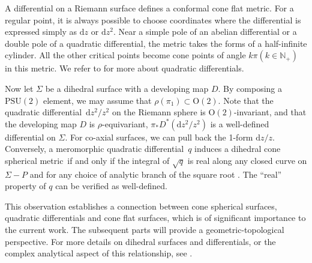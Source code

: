 \documentclass[pdflatex,sn-mathphys]{sn-jnl}%
\numberwithin{equation}{section}
\theoremstyle{thmstyleone}%
\newcommand{\NN}{\mathbb{N}}%
\newcommand{\PSUtwo}{\mathrm{PSU}(2)}
\newcommand{\Otwo}{\mathrm{O}(2)}
\newcommand{\qdf}{quadratic differential}
\newcommand{\csphsf}{cone spherical surface}
\newcommand{\csphmtr}{cone spherical metric}
\begin{document}
A differential on a Riemann surface defines a conformal cone flat metric. For a regular point, it is always possible to choose coordinates where the differential is expressed simply as $\mathrm{d}z$ or $\mathrm{d}z^2$. Near a simple pole of an abelian differential or a double pole of a \qdf, the metric takes the forms of a half-infinite cylinder. All the other critical points become cone points of angle $k\pi (k\in\NN_+)$ in this metric. We refer to \cite{Strebel, HubbardV1} for more about \qdf s.

\bigskip
Now let $\Sigma$ be a dihedral surface with a developing map $D$. 
By composing a $\PSUtwo$ element, we may assume that $\rho(\pi_1)\subset \Otwo$. Note that the \qdf\ $\mathrm{d}z^2/z^2$ on the Riemann sphere is $\Otwo$-invariant, and that the developing map $D$ is $\rho$-equivariant, $\pi_* D^* \left( \mathrm{d}z^2/z^2 \right)$ is a well-defined differential on $\Sigma$. 
For co-axial surfaces, we can pull back the 1-form $\mathrm{d}z/z$. 
Conversely, a meromorphic \qdf\ $q$ induces a dihedral \csphmtr\ if and only if the integral of $\sqrt{q}$ is real along any closed curve on $\Sigma-P$ and for any choice of analytic branch of the square root \cite{Li19,SCLX20}. %
The “real” property of $q$ can be verified as well-defined. %

This observation establishes a connection between \csphsf s, \qdf s and cone flat surfaces, which is of significant importance to the current work. The subsequent parts will provide a geometric-topological perspective. 
For more details on dihedral surfaces and differentials, or the complex analytical aspect of this relationship, see \cite{CWWX15, SCLX20, GT23}. 
\end{document}
